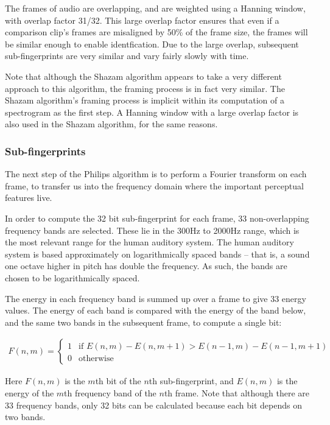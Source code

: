 \documentclass[12pt,a4paper,twoside,openright]{report}
\begin{document}
The frames of audio are overlapping, and are weighted using a Hanning window, with overlap factor 31/32. This large overlap factor ensures that even if a comparison clip's frames are misaligned by 50\% of the frame size, the frames will be similar enough to enable identfication. Due to the large overlap, subsequent sub-fingerprints are very similar and vary fairly slowly with time. 

Note that although the Shazam algorithm appears to take a very different approach to this algorithm, the framing process is in fact very similar. The Shazam algorithm's framing process is implicit within its computation of a spectrogram as the first step. A Hanning window with a large overlap factor is also used in the Shazam algorithm, for the same reasons.

\subsubsection{Sub-fingerprints}

The next step of the Philips algorithm is to perform a Fourier transform on each frame, to transfer us into the frequency domain where the important perceptual features live.

In order to compute the 32 bit sub-fingerprint for each frame, 33 non-overlapping frequency bands are selected. These lie in the 300Hz to 2000Hz range, which is the most relevant range for the human auditory system. The human auditory system is based approximately on logarithmically spaced bands -- that is, a sound one octave higher in pitch has double the frequency. As such, the bands are chosen to be logarithmically spaced.

The energy in each frequency band is summed up over a frame to give 33 energy values. The energy of each band is compared with the energy of the band below, and the same two bands in the subsequent frame, to compute a single bit:

\begin{align*}
  F(n,m)=
  \begin{cases}
      1 & \text{if } E(n,m)-E(n,m+1) > E(n-1,m)-E(n-1,m+1)\\
      0 & \text{otherwise}
  \end{cases}
\end{align*}

Here $F(n,m)$ is the $m$th bit of the $n$th sub-fingerprint, and $E(n,m)$ is the energy of the $m$th frequency band of the $n$th frame. Note that although there are 33 frequency bands, only 32 bits can be calculated because each bit depends on two bands.
\end{document}
